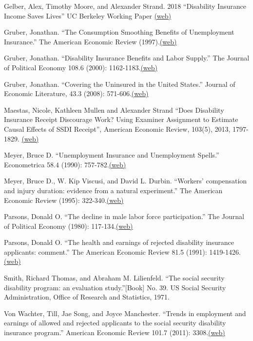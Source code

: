 \documentclass[landscape]{slides}
\begin{document}
\begin{slide}
{Gelber, Alex, Timothy Moore, and Alexander Strand. 2018
``Disability Insurance Income Saves Lives'' UC Berkeley Working Paper
\href{http://elsa.berkeley.edu/~saez/course/gelbermoorestrandDI18mortality.pdf} {(web)} 

Gruber, Jonathan. ``The Consumption Smoothing Benefits of Unemployment Insurance.'' The American Economic Review (1997).\href{http://www.nber.org/papers/w4750.pdf}{(web)}

Gruber, Jonathan. ``Disability Insurance Benefits and Labor Supply.'' The Journal of Political Economy 108.6 (2000): 1162-1183.\href{http://www.jstor.org/stable/pdfplus/10.1086/317682.pdf}{(web)}

Gruber, Jonathan. ``Covering the Uninsured in the United States.'' Journal of Economic Literature, 43.3 (2008): 571-606.\href{http://www.nber.org/papers/w13758.pdf}{(web)}

Maestas, Nicole, Kathleen Mullen and Alexander Strand
``Does Disability Insurance Receipt Discourage Work?
Using Examiner Assignment to Estimate Causal Effects of SSDI Receipt'', American Economic Review, 103(5), 2013,
1797-1829.
\href{http://elsa.berkeley.edu/~saez/course/maestas-mullen-strandAER13.pdf} {(web)} 

Meyer, Bruce D. ``Unemployment Insurance and Unemployment Spells.'' Econometrica 58.4 (1990): 757-782.\href{http://www.jstor.org/stable/pdfplus/2938349.pdf}{(web)}

Meyer, Bruce D., W. Kip Viscusi, and David L. Durbin. ``Workers' compensation and injury duration: evidence from a natural experiment.'' The American Economic Review (1995): 322-340.\href{http://www.jstor.org/stable/pdfplus/2118177.pdf}{(web)}

Parsons, Donald O. ``The decline in male labor force participation.'' The Journal of Political Economy (1980): 117-134.\href{http://www.jstor.org/stable/pdfplus/1830962.pdf}{(web)}

Parsons, Donald O. ``The health and earnings of rejected disability insurance applicants: comment.'' The American Economic Review 81.5 (1991): 1419-1426.\href{http://www.jstor.org/stable/pdfplus/2006930.pdf}{(web)}

Smith, Richard Thomas, and Abraham M. Lilienfeld. ``The social security disability program: an evaluation study.''[Book] No. 39. US Social Security Administration, Office of Research and Statistics, 1971.

Von Wachter, Till, Jae Song, and Joyce Manchester. ``Trends in employment and earnings of allowed and rejected applicants to the social security disability insurance program.'' American Economic Review 101.7 (2011): 3308.\href{http://elsa.berkeley.edu/~saez/course131/vonwachterAER11}{(web)}





}
\end{slide}
\end{document}
